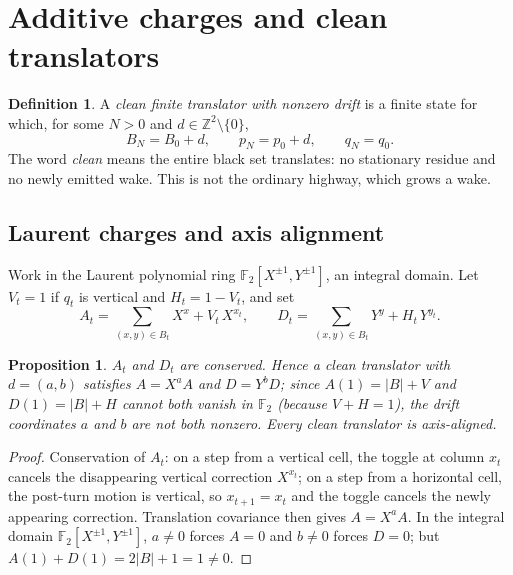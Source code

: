 \documentclass[11pt,reqno]{amsart}
\theoremstyle{plain}
\newtheorem{proposition}[theorem]{Proposition}
\theoremstyle{definition}
\newtheorem{definition}[theorem]{Definition}
\newcommand{\Z}{\mathbb{Z}}
\newcommand{\F}{\mathbb{F}}
\newcommand{\drift}{d}
\begin{document}
\section{Additive charges and clean translators}\label{sec:charges}

\begin{definition}\label{def:translator}
A \emph{clean finite translator with nonzero drift} is a finite state for which, for
some $N>0$ and $\drift\in\Z^2\setminus\{0\}$,
\[
B_N=B_0+\drift,\qquad p_N=p_0+\drift,\qquad q_N=q_0 .
\]
The word \emph{clean} means the entire black set translates: no stationary residue
and no newly emitted wake. This is not the ordinary highway, which grows a wake.
\end{definition}

\subsection{Laurent charges and axis alignment}
Work in the Laurent polynomial ring $\F_2[X^{\pm1},Y^{\pm1}]$, an integral domain.
Let $V_t=1$ if $q_t$ is vertical and $H_t=1-V_t$, and set
\[
A_t=\sum_{(x,y)\in B_t}X^x+V_t\,X^{x_t},\qquad
D_t=\sum_{(x,y)\in B_t}Y^y+H_t\,Y^{y_t}.
\]

\begin{proposition}\label{prop:laurent}
$A_t$ and $D_t$ are conserved. Hence a clean translator with $\drift=(a,b)$ satisfies
$A=X^aA$ and $D=Y^bD$; since $A(1)=|B|+V$ and $D(1)=|B|+H$ cannot both vanish in
$\F_2$ (because $V+H=1$), the drift coordinates $a$ and $b$ are not both nonzero.
Every clean translator is axis-aligned.
\end{proposition}

\begin{proof}
Conservation of $A_t$: on a step from a vertical cell, the toggle at column $x_t$
cancels the disappearing vertical correction $X^{x_t}$; on a step from a horizontal
cell, the post-turn motion is vertical, so $x_{t+1}=x_t$ and the toggle cancels the
newly appearing correction. Translation covariance then gives $A=X^aA$. In the
integral domain $\F_2[X^{\pm1},Y^{\pm1}]$, $a\neq0$ forces $A=0$ and $b\neq0$ forces
$D=0$; but $A(1)+D(1)=2|B|+1=1\neq0$.
\end{proof}
\end{document}
